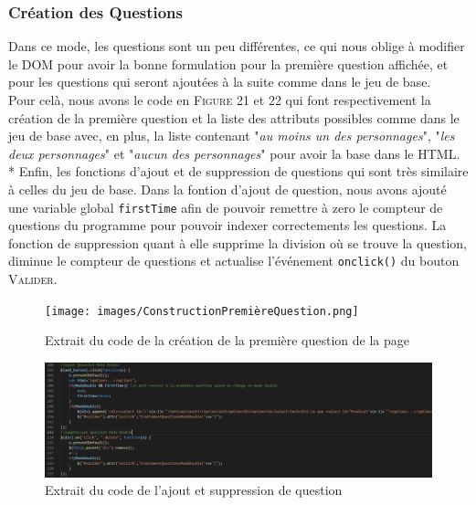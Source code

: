 \documentclass{article}
\begin{document}
            \subsubsection{Création des Questions}
                Dans ce mode, les questions sont un peu différentes, ce qui nous oblige à modifier le DOM pour avoir la bonne formulation pour la première question affichée, et pour les questions qui seront ajoutées à la suite comme dans le jeu de base.\\
                Pour celà, nous avons le code en \textsc{Figure 21} et \textsc{22} qui font respectivement la création de la première question et la liste des attributs possibles comme dans le jeu de base avec, en plus, la liste contenant "\textsl{au moins un des personnages}", "\textsl{les deux personnages}" et "\textsl{aucun des personnages}" pour avoir la base dans le HTML.\\*
                Enfin, les fonctions d'ajout et de suppression de questions qui sont très similaire à celles du jeu de base. Dans la fontion d'ajout de question, nous avons ajouté une variable global \texttt{firstTime} afin de pouvoir remettre à zero le compteur de questions du programme pour pouvoir indexer correctements les questions. La fonction de suppression quant à elle supprime la division où se trouve la question, diminue le compteur de questions et actualise l'événement \texttt{onclick()} du bouton \textsc{Valider}.
                \begin{figure}[h]
                    \centering                    \texttt{[image: images/ConstructionPremièreQuestion.png]}
                    \caption{Extrait du code de la création de la première question de la page}
                    \vspace{0.5cm} \includegraphics[width=15cm]{images/Ajout&SuppressionQuestionModeDouble.png}
                    \caption{Extrait du code de l'ajout et suppression de question}
                \end{figure}
                
\end{document}
